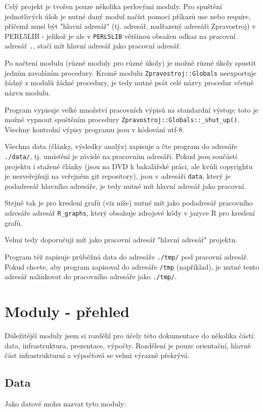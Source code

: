 \documentclass[12pt,a4paper]{report}
\begin{document}
Celý projekt je tvořen pouze několika perlovými moduly. Pro spuštění jednotlivých úloh je nutné daný modul načíst pomocí příkazů use nebo require, přičemž musí být "hlavní adresář" (tj. adresář, nadřazený adresáři Zpravostroj) v PERL5LIB - jelikož je ale v \texttt{PERL5LIB} většinou obsažen odkaz na pracovní adresář \texttt{.}, stačí mít hlavní adresář jako pracovní adresář.

Po načtení modulu (různé moduly pro různé úkoly) je možné různé úkoly spustit jedním zavoláním procedury. Kromě modulu \texttt{Zpravostroj::Globals} neexportuje žádný z modulů žádné procedury, je tedy nutné psát celé názvy procedur včetně názvu modulu.

Program vypisuje velké množství pracovních výpisů na standardní výstup; toto je možné vypnout spuštěním procedury \texttt{Zpravostroj::Globals::\_shut\_up()}. Všechny kontrolní výpisy programu jsou v kódování utf-8.

Všechna data (články, výsledky analýz) zapisuje a čte program do adresáře \texttt{./data/}, tj. umístění je závislé na pracovním adresáři. Pokud jsou součástí projektu i stažené články (jsou na DVD k bakalářské práci, ale kvůli copyrightu je nezveřejňuji na veřejném git repository), jsou v adresáři \texttt{data}, který je podadresář hlavního adresáře, je tedy nutné mít hlavní adresář jako pracovní.

Stejně tak je pro kreslení grafů (viz níže) nutné mít jako podadresář pracovního adresáře adresář \texttt{R\_graphs}, který obsahuje zdrojové kódy v jazyce R pro kreslení grafů.

Velmi tedy doporučuji mít jako pracovní adresář "hlavní adresář" projektu.

Program též zapisuje průběžná data do adresáře \texttt{./tmp/} pod pracovní adresář. Pokud chcete, aby program zapisoval do adresáře \texttt{/tmp} (například), je nutné tento adresář nalinkovat do pracovního adresáře jako \texttt{./tmp/}.

\chapter{Moduly - přehled}

Důležitější moduly jsem si rozdělil pro účely této dokumentace do několika částí: data, infrastruktura, prezentace, výpočty. Rozdělení je pouze orientační, hlavně část infrastrukturní a výpočtová se velmi výrazně překrývá.

\section{Data}
Jako datové mohu nazvat tyto moduly:
\end{document}
